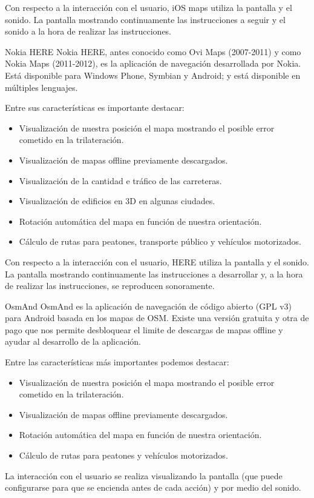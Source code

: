 \begin{definitionlist}
    Con respecto a la interacción con el usuario, iOS maps utiliza la pantalla y el sonido. La
    pantalla mostrando continuamente las instrucciones a seguir y el sonido a la hora de realizar
    las instrucciones.

  \item[Nokia HERE] Nokia HERE, antes conocido como Ovi Maps (2007-2011) y como Nokia Maps
    (2011-2012), es la aplicación de navegación desarrollada por Nokia. Está disponible para Windows
    Phone, Symbian y Android; y está disponible en múltiples lenguajes.

    Entre sus características es importante destacar:

    \begin{itemize}
      \item Visualización de nuestra posición el mapa mostrando el posible error cometido en la
        trilateración.
      \item Visualización de mapas offline previamente descargados.
      \item Visualización de la cantidad e tráfico de las carreteras.
      \item Visualización de edificios en 3D en algunas ciudades.
      \item Rotación automática del mapa en función de nuestra orientación.
      \item Cálculo de rutas para peatones, transporte público y vehículos motorizados.
    \end{itemize}

    Con respecto a la interacción con el usuario, HERE utiliza la pantalla y el sonido. La
    pantalla mostrando continuamente las instrucciones a desarrollar y, a la hora de realizar
    las instrucciones, se reproducen sonoramente.

  \item[OsmAnd] OsmAnd es la aplicación de navegación de código abierto (GPL v3) para Android basada
    en los mapas de \acf{OSM}. Existe una versión gratuita y otra de pago que nos permite
    desbloquear el limite de descargas de mapas offline y ayudar al desarrollo de la aplicación.

    Entre las características más importantes podemos destacar:

    \begin{itemize}
      \item Visualización de nuestra posición el mapa mostrando el posible error cometido en la
        trilateración.
      \item Visualización de mapas offline previamente descargados.
      \item Rotación automática del mapa en función de nuestra orientación.
      \item Cálculo de rutas para peatones y vehículos motorizados.
    \end{itemize}

    La interacción con el usuario se realiza visualizando la pantalla (que puede configurarse para
    que se encienda antes de cada acción) y por medio del sonido.

\end{definitionlist}

